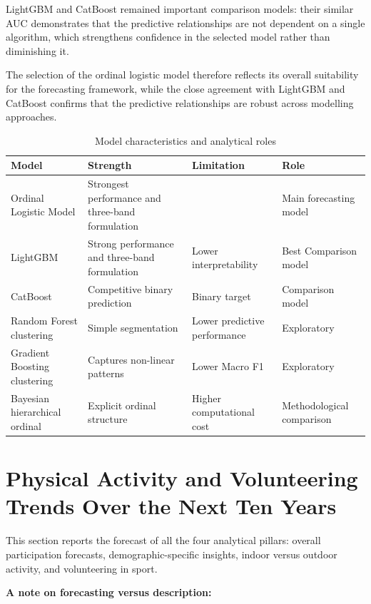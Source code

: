 \documentclass[ %
                    author={Ashrey Ashrey, Sanya Kapoor, Trisha Sharma, Yash Bhooshan Pandloskar},
                supervisor={Dr. Dalila O’Grady},
                    degree={MSc},
                     title={Using machine learning to forecast physical activity participation, volunteering and activity patterns in London},
                  subtitle={},
                      type={},
                      year={2021}]{dissertation}
\begin{document}
LightGBM and CatBoost remained important comparison models: their similar AUC demonstrates that the predictive relationships are not dependent on a single algorithm, which strengthens confidence in the selected model rather than diminishing it.

The selection of the ordinal logistic model therefore reflects its overall suitability for the forecasting framework, while the close agreement with LightGBM and CatBoost confirms that the predictive relationships are robust across modelling approaches.

\begin{table}[!htb]
\centering
\begin{tabular}{p{}p{}p{}p{}}
\toprule
\textbf{Model} & \textbf{Strength} & \textbf{Limitation} & \textbf{Role} \\
\midrule
Ordinal Logistic Model & Strongest performance and three-band formulation & & Main forecasting model \\
LightGBM & Strong performance and three-band formulation & Lower interpretability & Best Comparison model \\
CatBoost & Competitive binary prediction & Binary target & Comparison model \\
Random Forest clustering & Simple segmentation & Lower predictive performance & Exploratory \\
Gradient Boosting clustering & Captures non-linear patterns & Lower Macro F1 & Exploratory \\
Bayesian hierarchical ordinal & Explicit ordinal structure & Higher computational cost & Methodological comparison \\
\bottomrule
\end{tabular}
\caption{Model characteristics and analytical roles}
\label{tab:model-selection}
\end{table}

\FloatBarrier
\section{Physical Activity and Volunteering Trends Over the Next Ten Years}

\noindent
This section reports the forecast of all the four analytical pillars: overall participation forecasts, demographic-specific insights, indoor versus outdoor activity, and volunteering in sport.

\noindent
\textbf{A note on forecasting versus description:}
\end{document}
